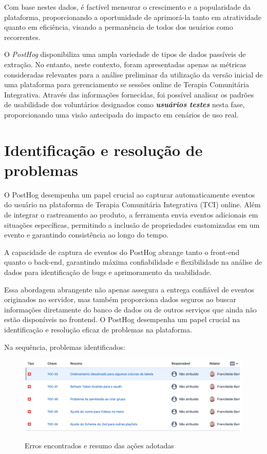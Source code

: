 \begin{enumerate}
\begin{enumerate}
Com base nestes dados, é factível mensurar o crescimento e a popularidade da plataforma, proporcionando a oportunidade de aprimorá-la tanto em atratividade quanto em eficiência, visando a permanência de todos dos usuários como recorrentes.
\end{enumerate}

\end{enumerate}

O \textit{PostHog} disponibiliza uma ampla variedade de tipos de dados passíveis de extração. No entanto, neste contexto, foram apresentadas apenas as métricas consideradas relevantes para a análise preliminar da utilização da versão inicial de uma plataforma para gerenciamento se sessões online de Terapia Comunitária Integrativa. Através das informações fornecidas, foi possível analisar os padrões de usabilidade dos voluntários designados como \textit\textbf{{usuários testes}} nesta fase, proporcionando uma visão antecipada do impacto em cenários de uso real.
 


\section{Identificação e resolução de problemas}
O PostHog desempenha um papel crucial ao capturar automaticamente eventos do usuário na plataforma de Terapia Comunitária Integrativa (TCI) online. Além de integrar o rastreamento ao produto, a ferramenta envia eventos adicionais em situações específicas, permitindo a inclusão de propriedades customizadas em um evento e garantindo consistência ao longo do tempo.

A capacidade de captura de eventos do PostHog abrange tanto o front-end quanto o back-end, garantindo máxima confiabilidade e flexibilidade na análise de dados para identificação de bugs e aprimoramento da usabilidade.

Essa abordagem abrangente não apenas assegura a entrega confiável de eventos originados no servidor, mas também proporciona dados seguros ao buscar informações diretamente do banco de dados ou de outros serviços que ainda não estão disponíveis no frontend. O PostHog desempenha um papel crucial na identificação e resolução eficaz de problemas na plataforma.

Na sequência, problemas identificados: 

\begin{figure}[!ht]
    \centering
    \includegraphics[scale=0.2]{latex/figuras/bugs.pdf}
    \label{bugs}
    \caption[Identificação e Resolução de Problemas]{Erros encontrados e resumo das ações adotadas}
    \label{fig:enter-label}
\end{figure}

